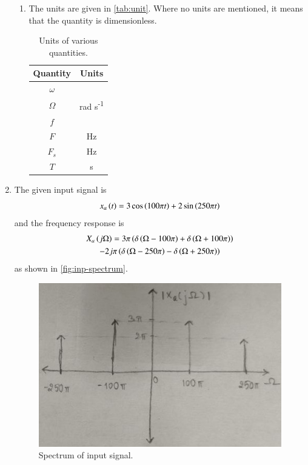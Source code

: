 \documentclass[journal,12pt,twocolumn]{IEEEtran}
\begin{document}
\begin{enumerate}[label=\theenumi.]
\begin{enumerate}
        \item The units are given in \autoref{tab:unit}. Where no units are
        mentioned, it means that the quantity is dimensionless.
        \begin{table}[!ht]
            \centering
            \begin{tabular}{|c|c|}
                \hline
                \textbf{Quantity} & \textbf{Units} \\
                \hline
                \(\omega\) & \\
                \hline
                \(\Omega\) & rad s\textsuperscript{-1} \\
                \hline
                \(f\) & \\
                \hline
                \(F\) & Hz \\
                \hline
                \(F_s\) & Hz \\
                \hline
                \(T\) & s \\
                \hline
            \end{tabular}
            \caption{Units of various quantities.}
            \label{tab:unit}
        \end{table}
    \end{enumerate}

    \item The given input signal is
    \begin{equation}
        x_a\left(t\right) = 3\cos\left(100\pi{}t\right) + 2\sin\left(250\pi{}t\right)
        \label{eq:x-in}
    \end{equation}
    and the frequency response is
    \begin{multline}
        X_a\left(j\Omega\right) = 3\pi\left(\delta\left(\Omega-100\pi\right) + \delta\left(\Omega+100\pi\right)\right) \\
        - 2j\pi\left(\delta\left(\Omega-250\pi\right) - \delta\left(\Omega+250\pi\right)\right)
    \end{multline}
    as shown in \autoref{fig:inp-spectrum}.

    \begin{figure}[!ht]
        \centering
        \includegraphics[width=\columnwidth]{figs/inp-spectrum.jpg}
        \caption{Spectrum of input signal.}
        \label{fig:inp-spectrum}
    \end{figure}


\end{enumerate}
\end{document}
